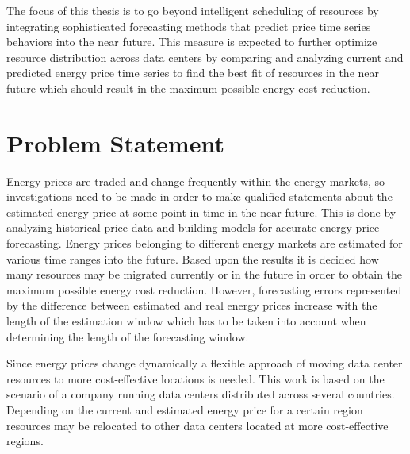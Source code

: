 The focus of this thesis is to go beyond intelligent scheduling of resources by integrating sophisticated forecasting methods that predict price time series behaviors into the near future. This measure is expected to further optimize resource distribution across data centers by comparing and analyzing current and predicted energy price time series to find the best fit of resources in the near future which should result in the maximum possible energy cost reduction.



\section{Problem Statement}

Energy prices are traded and change frequently within the energy markets, so investigations need to be made in order to make qualified statements about the estimated energy price at some point in time in the near future.
This is done by analyzing historical price data and building models for accurate energy price forecasting. Energy prices belonging to different energy markets are estimated for various time ranges into the future. Based upon the results it is decided how many resources may be migrated currently or in the future in order to obtain the maximum possible energy cost reduction. 
However, forecasting errors represented by the difference between estimated and real energy prices increase with the length of the estimation window which has to be taken into account when determining the length of the forecasting window. 

Since energy prices change dynamically a flexible approach of moving data center resources to more cost-effective locations is needed. This work is based on the scenario of a company running data centers distributed across several countries. Depending on the current and estimated energy price for a certain region resources may be relocated to other data centers located at more cost-effective regions.

